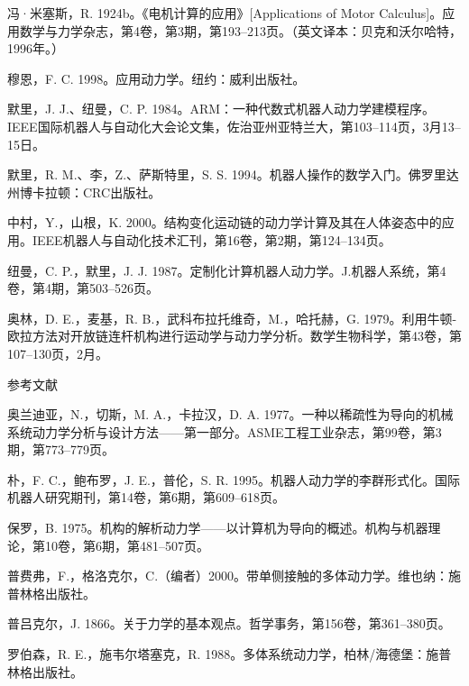 \documentclass[10pt,a4paper]{book}
\theoremstyle{thmstyle} %
\theoremstyle{defstyle} %
\theoremstyle{prostyle} %
\begin{document}
冯·米塞斯，R. 1924b。《电机计算的应用》[Applications of Motor Calculus]。应用数学与力学杂志，第4卷，第3期，第193–213页。（英文译本：贝克和沃尔哈特，1996年。）



穆恩，F. C. 1998。应用动力学。纽约：威利出版社。



默里，J. J.、纽曼，C. P. 1984。ARM：一种代数式机器人动力学建模程序。IEEE国际机器人与自动化大会论文集，佐治亚州亚特兰大，第103–114页，3月13–15日。



默里，R. M.、李，Z.、萨斯特里，S. S. 1994。机器人操作的数学入门。佛罗里达州博卡拉顿：CRC出版社。



中村，Y.，山根，K. 2000。结构变化运动链的动力学计算及其在人体姿态中的应用。IEEE机器人与自动化技术汇刊，第16卷，第2期，第124–134页。



纽曼，C. P.，默里，J. J. 1987。定制化计算机器人动力学。J.机器人系统，第4卷，第4期，第503–526页。



奥林，D. E.，麦基，R. B.，武科布拉托维奇，M.，哈托赫，G. 1979。利用牛顿-欧拉方法对开放链连杆机构进行运动学与动力学分析。数学生物科学，第43卷，第107–130页，2月。



参考文献



奥兰迪亚，N.，切斯，M. A.，卡拉汉，D. A. 1977。一种以稀疏性为导向的机械系统动力学分析与设计方法——第一部分。ASME工程工业杂志，第99卷，第3期，第773–779页。



朴，F. C.，鲍布罗，J. E.，普伦，S. R. 1995。机器人动力学的李群形式化。国际机器人研究期刊，第14卷，第6期，第609–618页。



保罗，B. 1975。机构的解析动力学——以计算机为导向的概述。机构与机器理论，第10卷，第6期，第481–507页。



普费弗，F.，格洛克尔，C.（编者）2000。带单侧接触的多体动力学。维也纳：施普林格出版社。



普吕克尔，J. 1866。关于力学的基本观点。哲学事务，第156卷，第361–380页。



罗伯森，R. E.，施韦尔塔塞克，R. 1988。多体系统动力学，柏林/海德堡：施普林格出版社。
\end{document}
